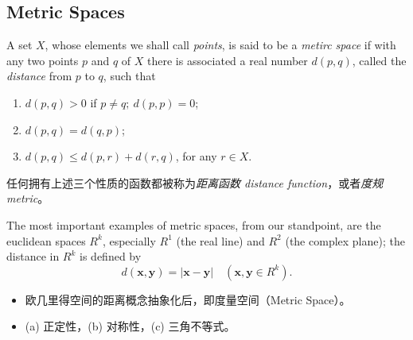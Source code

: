 \documentclass[../poma-notes.tex]{subfiles}
\begin{document}
\subsection*{Metric Spaces}

\begin{definition}
  A set $X$, whose elements we shall call \textit{points}, is said to be a \textit{metirc space} if with any two points
  $p$ and $q$ of $X$ there is associated a real number $d(p,q)$, called the \textit{distance} from $p$ to $q$, such that
  \begin{enumerate}[label=(\alph*)]
    \item $d(p,q)>0$ if $p \ne q; \ d(p, p) = 0$;
    \item $d(p,q) = d(q,p)$;
    \item $d(p,q) \le d(p,r) + d(r,q)$, for any $r \in X$.
  \end{enumerate}
\end{definition}

任何拥有上述三个性质的函数都被称为\textit{距离函数 distance function}，或者\textit{度规 metric}。

\begin{examples}
  The most important examples of metric spaces, from our standpoint, are the euclidean spaces $R^k$, especially $R^1$
  (the real line) and $R^2$ (the complex plane); the distance in $R^k$ is defined by
  \begin{equation}
    d(\mathbf{x}, \mathbf{y}) = |\mathbf{x} - \mathbf{y}| \quad (\mathbf{x},\mathbf{y} \in R^k).
  \end{equation}
\end{examples}

\begin{anote}
  \begin{itemize}
    \item 欧几里得空间的距离概念抽象化后，即度量空间（Metric Space）。
    \item (a) 正定性，(b) 对称性，(c) 三角不等式。
  \end{itemize}
\end{anote}
\end{document}
